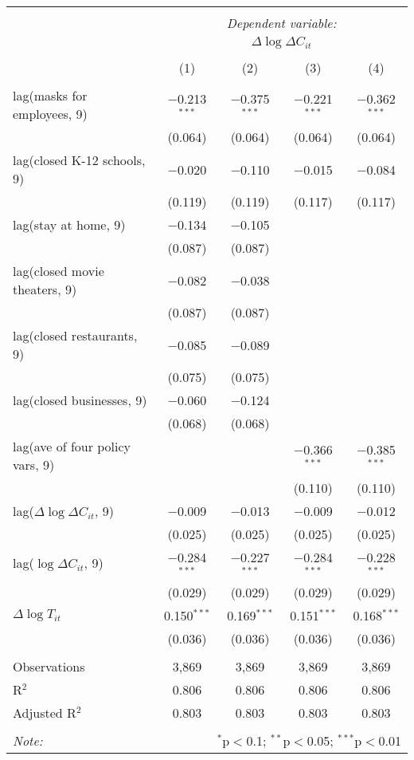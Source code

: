 \begin{tabular}{@{\extracolsep{1pt}}lcccc} 
\\[-1.8ex]\hline 
\hline \\[-1.8ex] 
 & \multicolumn{4}{c}{\textit{Dependent variable:}} \\ 
\cline{2-5} 
 & \multicolumn{4}{c}{$\Delta \log \Delta C_{it}$} \\ 
\\[-1.8ex] & (1) & (2) & (3) & (4)\\ 
\hline \\[-1.8ex] 
 lag(masks for employees, 9) & $-$0.213$^{***}$ & $-$0.375$^{***}$ & $-$0.221$^{***}$ & $-$0.362$^{***}$ \\ 
  & (0.064) & (0.064) & (0.064) & (0.064) \\ 
  lag(closed K-12 schools, 9) & $-$0.020 & $-$0.110 & $-$0.015 & $-$0.084 \\ 
  & (0.119) & (0.119) & (0.117) & (0.117) \\ 
  lag(stay at home, 9) & $-$0.134 & $-$0.105 &  &  \\ 
  & (0.087) & (0.087) &  &  \\ 
  lag(closed movie theaters, 9) & $-$0.082 & $-$0.038 &  &  \\ 
  & (0.087) & (0.087) &  &  \\ 
  lag(closed restaurants, 9) & $-$0.085 & $-$0.089 &  &  \\ 
  & (0.075) & (0.075) &  &  \\ 
  lag(closed businesses, 9) & $-$0.060 & $-$0.124 &  &  \\ 
  & (0.068) & (0.068) &  &  \\ 
  lag(ave of four policy vars, 9) &  &  & $-$0.366$^{***}$ & $-$0.385$^{***}$ \\ 
  &  &  & (0.110) & (0.110) \\ 
  lag($\Delta \log \Delta C_{it}$, 9) & $-$0.009 & $-$0.013 & $-$0.009 & $-$0.012 \\ 
  & (0.025) & (0.025) & (0.025) & (0.025) \\ 
  lag($\log \Delta C_{it}$, 9) & $-$0.284$^{***}$ & $-$0.227$^{***}$ & $-$0.284$^{***}$ & $-$0.228$^{***}$ \\ 
  & (0.029) & (0.029) & (0.029) & (0.029) \\ 
  $\Delta \log T_{it}$ & 0.150$^{***}$ & 0.169$^{***}$ & 0.151$^{***}$ & 0.168$^{***}$ \\ 
  & (0.036) & (0.036) & (0.036) & (0.036) \\ 
 \hline \\[-1.8ex] 
Observations & 3,869 & 3,869 & 3,869 & 3,869 \\ 
R$^{2}$ & 0.806 & 0.806 & 0.806 & 0.806 \\ 
Adjusted R$^{2}$ & 0.803 & 0.803 & 0.803 & 0.803 \\ 
\hline 
\hline \\[-1.8ex] 
\textit{Note:}  & \multicolumn{4}{r}{$^{*}$p$<$0.1; $^{**}$p$<$0.05; $^{***}$p$<$0.01} \\ 
\end{tabular} 